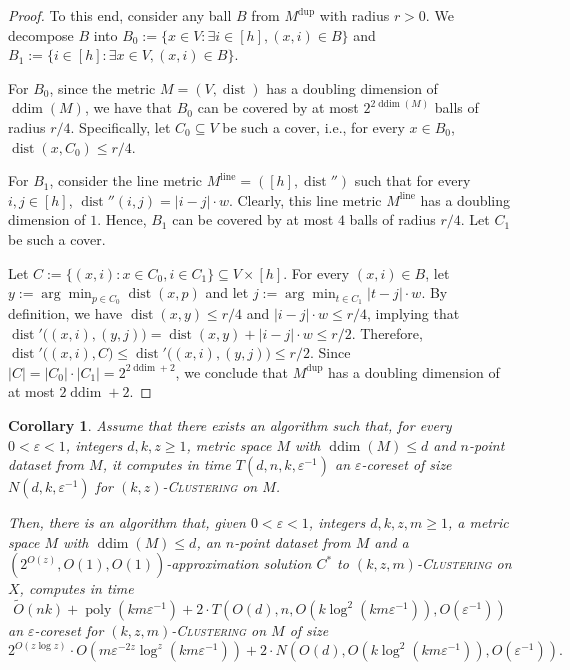 \documentclass[letterpaper,11pt]{article}
\theoremstyle{plain}
\newtheorem{corollary}[theorem]{Corollary}
\theoremstyle{definition}
\theoremstyle{remark}
\DeclareMathOperator{\poly}{poly}
\DeclareMathOperator{\ddim}{ddim}
\DeclareMathOperator{\dist}{dist}
\newcommand{\dup}{\mathrm{dup}}
\newcommand{\eps}{\varepsilon}
\newcommand{\ProblemName}[1]{\textsc{#1}}
\newcommand{\kzC}{\ProblemName{$(k,z)$-Clustering}\xspace}
\newcommand{\kzmC}{\ProblemName{$(k,z,m)$-Clustering}\xspace}
\begin{document}
\begin{appendices}
\begin{proof}
    To this end, consider any ball $B$ from $M^\dup$ with radius $r>0$.
    We decompose $B$ into $B_0:=\{x\in V:\exists i\in [h], (x,i)\in B\}$ and $B_1:=\{i\in [h]: \exists x\in V, (x,i)\in B\}$. 

    For $B_0$, since the metric $M=(V,\dist)$ has a doubling dimension of $\ddim(M)$, we have that $B_0$ can be covered by at most $2^{2\ddim(M)}$ balls of radius $r/4$. Specifically, let $C_0\subseteq V$ be such a cover, i.e., for every $x\in B_0$, $\dist(x,C_0)\le r/4$.
    
    For $B_1$, consider the line metric $M^\mathrm{line}=([h],\dist'')$ such that for every $i,j\in [h]$, $\dist''(i,j)=|i-j|\cdot w$. Clearly, this line metric $M^\mathrm{line}$ has a doubling dimension of $1$. Hence, $B_1$ can be covered by at most $4$ balls of radius $r/4$. Let $C_1$ be such a cover.

    Let $C:=\{(x,i):x\in C_0,i\in C_1\}\subseteq V\times [h]$. For every $(x,i)\in B$, let $y:=\arg\min_{p\in C_0}\dist(x,p)$ and let $j:=\arg\min_{t\in C_1}|t-j|\cdot w$. By definition, we have $\dist(x,y)\le r/4$ and $|i-j|\cdot w\le r/4$, implying that $\dist'\big((x,i),(y,j) \big) = \dist(x,y) + |i-j|\cdot w\le r/2$. Therefore, $\dist'\big((x,i), C \big)\le \dist'\big((x,i),(y,j) \big)\le r/2$. Since $|C|=|C_0|\cdot |C_1| = 2^{2\ddim + 2}$, we conclude that $M^\dup$ has a doubling dimension of at most $2\ddim + 2$.
\end{proof}





\begin{corollary}
    \label{cor:doubline}
    Assume that there exists an algorithm such that, for every $0<\eps<1$, integers $d,k,z\ge 1$, metric space $M$ with $\ddim(M)\le d$ and $n$-point dataset from $M$, it computes in time $T(d,n,k,\eps^{-1})$ an $\eps$-coreset of size $N(d,k,\eps^{-1})$ for \kzC on $M$.
    
    Then, there is an algorithm that, given $0<\eps<1$, integers $d,k,z,m\ge 1$, a metric space $M$ with $\ddim(M)\le d$, an $n$-point dataset from $M$ and a $(2^{O(z)},O(1),O(1))$-approximation solution $C^*$ to \kzmC on $X$, computes in time 
    \begin{equation*}
        \tilde O(nk) + \poly(km\eps^{-1}) + 2\cdot T(O(d),n,O(k\log^2(km\eps^{-1})),O(\eps^{-1}))
    \end{equation*}
    an $\eps$-coreset for \kzmC on $M$ of size 
    \begin{equation*}
        2^{O(z\log z)}\cdot O\left(m\eps^{-2z}\log^z(km\eps^{-1})\right) + 2\cdot N\left(O(d), O(k\log^2(km\eps^{-1})), O(\eps^{-1})\right).
    \end{equation*}
\end{corollary}


\end{appendices}
\end{document}
